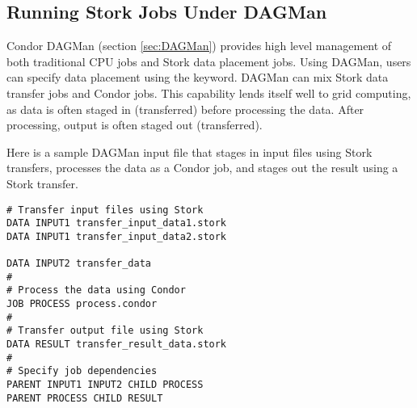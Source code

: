 \subsection{\label{sec:Stork-Advanced}Running Stork Jobs Under DAGMan}

Condor DAGMan (section \ref{sec:DAGMan}) provides high level management
of both traditional CPU jobs and Stork data placement jobs. 
Using DAGMan, users can specify data placement
using the  keyword.
DAGMan can mix Stork data transfer jobs 
and Condor jobs.
This capability lends itself well to grid computing,
as data is often staged in (transferred)
before processing the data.
After processing, output is often staged out (transferred).

Here is a sample DAGMan input file
that stages in input files using Stork transfers,
processes the data as a Condor job,
and stages out the result using a Stork transfer.

\footnotesize
\begin{verbatim}
# Transfer input files using Stork
DATA INPUT1 transfer_input_data1.stork
DATA INPUT1 transfer_input_data2.stork

DATA INPUT2 transfer_data
#
# Process the data using Condor
JOB PROCESS process.condor
#
# Transfer output file using Stork
DATA RESULT transfer_result_data.stork
#
# Specify job dependencies
PARENT INPUT1 INPUT2 CHILD PROCESS
PARENT PROCESS CHILD RESULT
\end{verbatim}
\normalsize
